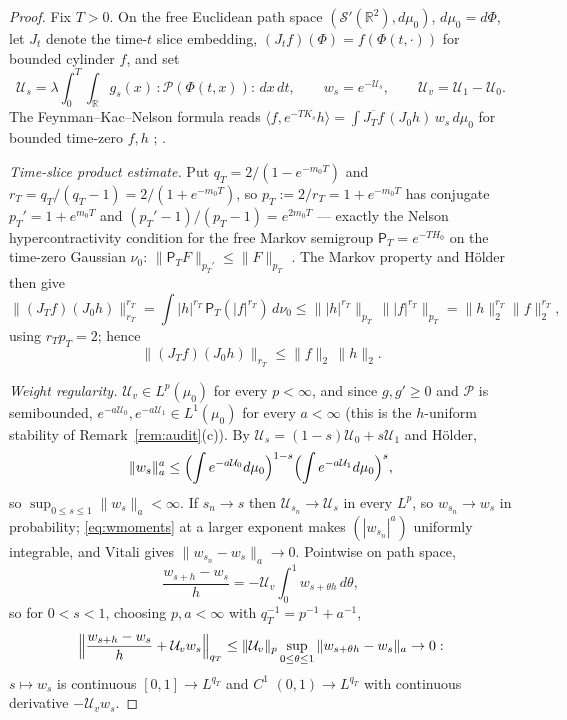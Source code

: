 \documentclass[11pt,a4paper]{article}
\theoremstyle{plain}
\theoremstyle{definition}
\newcommand{\R}{\mathbb{R}}
\newcommand{\ip}[2]{\langle #1,#2\rangle}
\begin{document}
\begin{proof}
Fix $T>0$. On the free Euclidean path space $(\mathcal S'(\R^2),d\mu_0)$, $d\mu_0=d\Phi$, let
$J_t$ denote the time-$t$ slice embedding, $(J_tf)(\Phi)=f(\Phi(t,\cdot))$ for bounded cylinder
$f$, and set
\[
  \mathcal U_s=\lambda\int_0^T\!\!\int_\R g_s(x)\,{:}\mathscr P(\Phi(t,x)){:}\,dx\,dt,
  \qquad w_s=e^{-\mathcal U_s},\qquad \mathcal U_v=\mathcal U_1-\mathcal U_0 .
\]
The Feynman--Kac--Nelson formula reads
$\ip{f}{e^{-TK_s}h}=\int\overline{J_Tf}\,(J_0h)\,w_s\,d\mu_0$ for bounded time-zero $f,h$
\cite[Cor.~V.14, Thm.~V.15]{SimonBook}; \cite[Thm.~II.16]{GRS75}.

\emph{Time-slice product estimate.} Put $q_T=2/(1-e^{-m_0T})$ and $r_T=q_T/(q_T-1)=
2/(1+e^{-m_0T})$, so $p_T:=2/r_T=1+e^{-m_0T}$ has conjugate $p_T'=1+e^{m_0T}$ and
$(p_T'-1)/(p_T-1)=e^{2m_0T}$ --- exactly the Nelson hypercontractivity condition for the free
Markov semigroup $\mathsf P_T=e^{-TH_0}$ on the time-zero Gaussian $\nu_0$:
$\|\mathsf P_TF\|_{p_T'}\le\|F\|_{p_T}$ \cite[Thms.~I.17, III.17]{SimonBook}. The Markov property
and H\"older then give
\[
  \|(J_Tf)(J_0h)\|_{r_T}^{r_T}
  =\int|h|^{r_T}\,\mathsf P_T(|f|^{r_T})\,d\nu_0
  \le\||h|^{r_T}\|_{p_T}\,\||f|^{r_T}\|_{p_T}
  =\|h\|_2^{r_T}\|f\|_2^{r_T},
\]
using $r_Tp_T=2$; hence
\begin{equation}\label{eq:timeslice-main}
  \|(J_Tf)(J_0h)\|_{r_T}\le\|f\|_2\,\|h\|_2 .
\end{equation}

\emph{Weight regularity.} $\mathcal U_v\in L^p(\mu_0)$ for every $p<\infty$, and since
$g,g'\ge0$ and $\mathscr P$ is semibounded, $e^{-a\mathcal U_0},e^{-a\mathcal U_1}\in L^1(\mu_0)$
for every $a<\infty$ \cite[Thm.~V.7]{SimonBook} (this is the $h$-uniform stability of
Remark~\ref{rem:audit}(c)). By $\mathcal U_s=(1-s)\mathcal U_0+s\mathcal U_1$ and H\"older,
\begin{equation}\label{eq:wmoments}
  \|w_s\|_a^a\le\Bigl(\int e^{-a\mathcal U_0}d\mu_0\Bigr)^{1-s}
  \Bigl(\int e^{-a\mathcal U_1}d\mu_0\Bigr)^{s},
\end{equation}
so $\sup_{0\le s\le1}\|w_s\|_a<\infty$. If $s_n\to s$ then $\mathcal U_{s_n}\to\mathcal U_s$ in
every $L^p$, so $w_{s_n}\to w_s$ in probability; \eqref{eq:wmoments} at a larger exponent makes
$(|w_{s_n}|^a)$ uniformly integrable, and Vitali gives $\|w_{s_n}-w_s\|_a\to0$. Pointwise on
path space,
\[
  \frac{w_{s+h}-w_s}{h}=-\mathcal U_v\int_0^1w_{s+\theta h}\,d\theta ,
\]
so for $0<s<1$, choosing $p,a<\infty$ with $q_T^{-1}=p^{-1}+a^{-1}$,
\[
  \Bigl\|\frac{w_{s+h}-w_s}{h}+\mathcal U_vw_s\Bigr\|_{q_T}
  \le\|\mathcal U_v\|_p\sup_{0\le\theta\le1}\|w_{s+\theta h}-w_s\|_a\to0 :
\]
$s\mapsto w_s$ is continuous $[0,1]\to L^{q_T}$ and $C^1$ $(0,1)\to L^{q_T}$ with continuous
derivative $-\mathcal U_vw_s$.


\end{proof}
\end{document}
